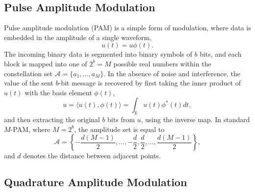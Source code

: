 \subsection{Pulse Amplitude Modulation}

Pulse amplitude modulation (PAM) is a simple form of modulation, where data is embedded in the amplitude of a single waveform,
\begin{equation*}
u(t) = u \phi (t) .
\end{equation*}
The incoming binary data is segmented into binary symbols of $b$ bits, and each block is mapped into one of $2^b = M$ possible real numbers within the constellation set $\mathcal{A} = \{ a_1, \ldots, a_M \}$.
In the absence of noise and interference, the value of the sent $b$-bit message is recovered by first taking the inner product of $u(t)$ with the basis element $\phi (t)$,
\begin{equation*}
u = \langle u(t), \phi(t) \rangle = \int_{\mathbb{R}} u(t) \phi^*(t) dt ,
\end{equation*}
and then extracting the original $b$ bits from $u$, using the inverse map.
In standard $M$-PAM, where $M = 2^b$, the amplitude set is equal to
\begin{equation*}
\mathcal{A} = \left\{ - \frac{d(M-1)}{2} , \ldots, - \frac{d}{2}, \frac{d}{2}, \ldots, \frac{d(M-1)}{2} \right\} ,
\end{equation*}
and $d$ denotes the distance between adjacent points.

\subsection{Quadrature Amplitude Modulation}

